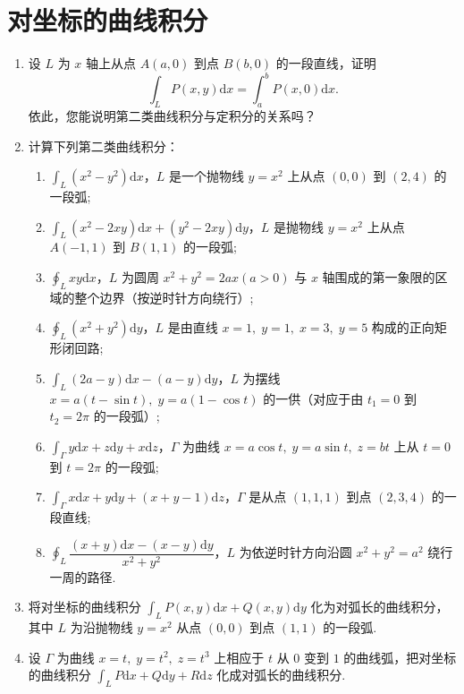 \section{对坐标的曲线积分}
\begin{enumerate}\setlength{\itemsep}{7pt}
    \item 设 $L$ 为 $x$ 轴上从点 $A(a, 0)$ 到点 $B(b, 0)$ 的一段直线，证明
    \[
        \int_{L}P(x, y)\text{d}x = \int_{a}^{b}P(x, 0)\text{d}x.
    \]
    依此，您能说明第二类曲线积分与定积分的关系吗？

    \item 计算下列第二类曲线积分：
    \begin{enumerate}[(1)]\setlength{\itemsep}{5pt}\setlength{\topsep}{15pt}
        \item $\displaystyle\int_{L}(x^2-y^2)\text{d}x$，$L$ 是一个抛物线 $y=x^2$ 上从点 $(0, 0)$ 到 $(2, 4)$ 的一段弧;
        \item $\displaystyle\int_{L}(x^2-2xy)\text{d}x+(y^2-2xy)\text{d}y$，$L$ 是抛物线 $y=x^2$ 上从点 $A(-1, 1)$ 到 $B(1, 1)$ 的一段弧;
        \item $\displaystyle\oint_{L}xy\text{d}x$，$L$ 为圆周 $x^2+y^2=2ax(a>0)$ 与 $x$ 轴围成的第一象限的区域的整个边界（按逆时针方向绕行）;
        \item $\displaystyle\oint_{L}(x^2+y^2)\text{d}y$，$L$ 是由直线 $x=1,\;y=1,\;x=3,\;y=5$ 构成的正向矩形闭回路;
        \item $\displaystyle\int_{L}(2a-y)\text{d}x-(a-y)\text{d}y$，$L$ 为摆线 $x=a(t-\sin t),\;y=a(1-\cos t)$ 的一供（对应于由 $t_1=0$ 到 $t_2=2\pi$ 的一段弧）;
        \item $\displaystyle\int_{\Gamma}y\text{d}x+z\text{d}y+x\text{d}z$，$\Gamma$ 为曲线 $x=a\cos t,\;y=a\sin t,\;z=bt$ 上从 $t=0$ 到 $t=2\pi$ 的一段弧;
        \item $\displaystyle\int_{\Gamma}x\text{d}x+y\text{d}y+(x+y-1)\text{d}z$，$\Gamma$ 是从点 $(1, 1, 1)$ 到点 $(2, 3, 4)$ 的一段直线;
        \item $\displaystyle\oint_{L}\dfrac{(x+y)\text{d}x-(x-y)\text{d}y}{x^2+y^2}$，$L$ 为依逆时针方向沿圆 $x^2+y^2=a^2$ 绕行一周的路径.
    \end{enumerate}

    \item 将对坐标的曲线积分 $\displaystyle\int_{L}P(x, y)\text{d}x+Q(x, y)\text{d}y$ 化为对弧长的曲线积分，其中 $L$ 为沿抛物线 $y=x^2$ 从点 $(0, 0)$ 到点 $(1, 1)$ 的一段弧.
    
    \item 设 $\Gamma$ 为曲线 $x=t,\;y=t^2,\;z=t^3$ 上相应于 $t$ 从 $0$ 变到 $1$ 的曲线弧，把对坐标的曲线积分 $\displaystyle\int_{L}P\text{d}x+Q\text{d}y+R\text{d}z$ 化成对弧长的曲线积分.
    

\end{enumerate}
